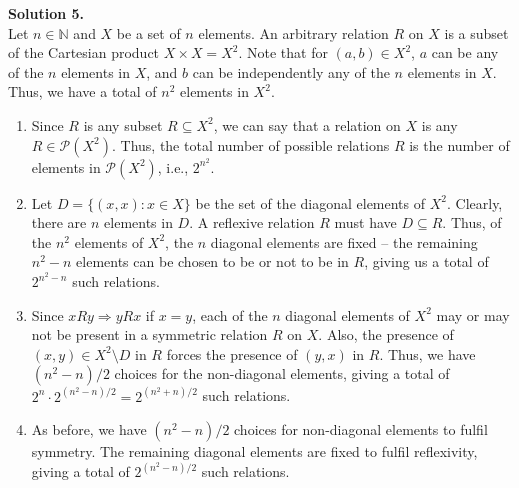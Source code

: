 \documentclass[10pt]{article}
\begin{document}
        \textbf{Solution 5.}\\
        Let $n \in \mathbb{N}$ and $X$ be a set of $n$ elements.
        An arbitrary relation $R$ on $X$ is a subset of the Cartesian product $X\times X = X^2$.
        Note that for $(a, b) \in X^2$, $a$ can be any of the $n$ elements in $X$, and $b$ can be independently any
        of the $n$ elements in $X$. Thus, we have a total of $n^2$ elements in $X^2$.
        \begin{enumerate}
                \item Since $R$ is any subset $R \subseteq X^2$, we can say that a relation on $X$ is any $R \in \mathcal{P}(X^2)$.
                Thus, the total number of possible relations $R$ is the number of elements in $\mathcal{P}(X^2)$, i.e., $2^{n^2}$.

                \item Let $D = \{(x, x) : x \in X\}$ be the set of the diagonal elements of $X^2$. Clearly, there are $n$ elements in $D$.
                A reflexive relation $R$ must have $D \subseteq R$. Thus, of the $n^2$ elements of $X^2$, the $n$ diagonal elements
                are fixed -- the remaining $n^2 - n$ elements can be chosen to be or not to be in $R$, giving us a total of
                $2^{n^2 - n}$ such relations.

                \item Since $xRy \Rightarrow yRx$ if $x = y$, each of the $n$ diagonal elements of $X^2$ may or may not be present in a
                symmetric relation $R$ on $X$. Also, the presence of $(x, y) \in X^2\setminus D$ in $R$ forces the presence
                of $(y, x)$ in $R$. Thus, we have $(n^2 - n)/2$ choices for the non-diagonal elements, giving a total of
                $2^n \cdot 2^{(n^2 - n)/2} = 2^{(n^2 + n)/2}$ such relations.

                \item As before, we have $(n^2 - n)/2$ choices for non-diagonal elements to fulfil symmetry. The remaining diagonal
                elements are fixed to fulfil reflexivity, giving a total of $2^{(n^2 - n)/2}$ such relations.
        \end{enumerate}
\end{document}
